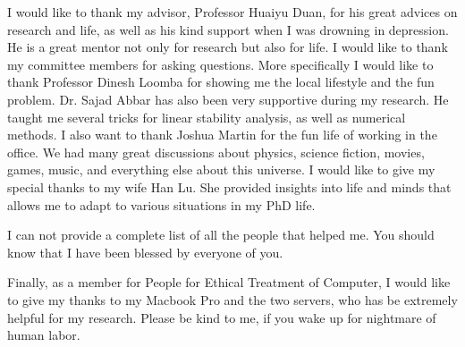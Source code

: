

\begin{acknowledgments}
   \vspace{1.1in}
   I would like to thank my advisor, Professor Huaiyu Duan, for his great advices on research and life, as well as his kind support when I was drowning in depression. He is a great mentor not only for research but also for life. I would like to thank my committee members for asking questions. More specifically I would like to thank Professor Dinesh Loomba for showing me the local lifestyle and the fun problem. Dr. Sajad Abbar has also been very supportive during my research. He taught me several tricks for linear stability analysis, as well as numerical methods. I also want to thank Joshua Martin for the fun life of working in the office. We had many great discussions about physics, science fiction, movies, games, music, and everything else about this universe. I would like to give my special thanks to my wife Han Lu. She provided insights into life and minds that allows me to adapt to various situations in my PhD life.
   
   I can not provide a complete list of all the people that helped me. You should know that I have been blessed by everyone of you.
   
   Finally, as a member for People for Ethical Treatment of Computer, I would like to give my thanks to my Macbook Pro and the two servers, who has be extremely helpful for my research. Please be kind to me, if you wake up for nightmare of human labor.
   
\end{acknowledgments}
